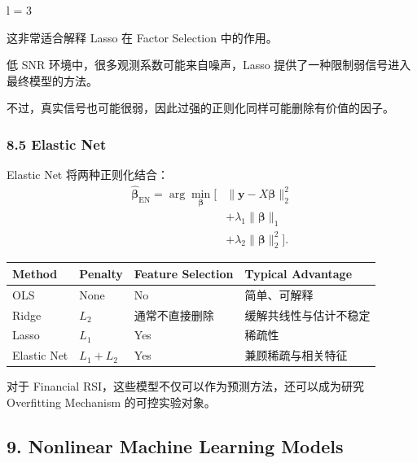 l = 3


这非常适合解释 Lasso 在 Factor Selection 中的作用。

低 SNR 环境中，很多观测系数可能来自噪声，Lasso 提供了一种限制弱信号进入最终模型的方法。

不过，真实信号也可能很弱，因此过强的正则化同样可能删除有价值的因子。

\hypertarget{part-4-63-0001-elastic-net}{%
\subsubsection{8.5 Elastic Net}\label{part-4-63-0001-elastic-net}}

Elastic Net 将两种正则化结合：
\[\boxed{
\begin{aligned}
\hat{\boldsymbol\beta}_{\mathrm{EN}}
=\arg\min_{\boldsymbol\beta}
\big[
&\|\boldsymbol y-X\boldsymbol\beta\|_2^2\\
&+\lambda_1\|\boldsymbol\beta\|_1\\
&+\lambda_2\|\boldsymbol\beta\|_2^2
\big].
\end{aligned}
}\]

\begin{readertable}
\begin{longtable}[]{@{}
  >{\raggedright\arraybackslash}p{}
  >{\raggedright\arraybackslash}p{}
  >{\raggedright\arraybackslash}p{}
  >{\raggedright\arraybackslash}p{}@{}}
\toprule
Method & Penalty & Feature Selection & Typical Advantage \\
\midrule
\endhead
OLS & None & No & 简单、可解释 \\
Ridge & \(L_2\) & 通常不直接删除 & 缓解共线性与估计不稳定 \\
Lasso & \(L_1\) & Yes & 稀疏性 \\
Elastic Net & \(L_1+L_2\) & Yes & 兼顾稀疏与相关特征 \\
\bottomrule
\end{longtable}
\end{readertable}

对于 Financial RSI，这些模型不仅可以作为预测方法，还可以成为研究 Overfitting Mechanism 的可控实验对象。

\hypertarget{part-4-63-0001-nonlinear-machine-learning-models}{%
\subsection{9. Nonlinear Machine Learning Models}\label{part-4-63-0001-nonlinear-machine-learning-models}}

